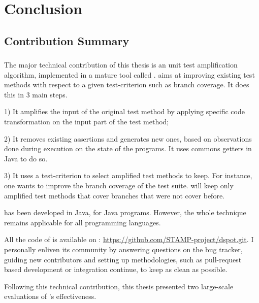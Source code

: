 \chapter{Conclusion}
\label{chap:conclusion}

\minitoc

\graphicspath{{.}{chapitres/conclusion/}}

\section{Contribution Summary}
\label{sec:conclusion:contributions-summary}

\subsection{\dspot}
\label{subsec:conclusion:contributions-summary:dspot}

The major technical contribution of this thesis is an unit test amplification algorithm, implemented in a mature tool called \dspot.
\dspot aims at improving existing test methods with respect to a given test-criterion such as branch coverage.
It does this in 3 main steps.

1) It amplifies the input of the original test method by applying specific code transformation on the input part of the test method;

2) It removes existing assertions and generates new ones, based on observations done during execution on the state of the programs.
It uses commons getters in Java to do so.

3) It uses a test-criterion to select amplified test methods to keep.
For instance, one wants to improve the branch coverage of the test suite.
\dspot will keep only amplified test methods that cover branches that were not cover before.

\dspot has been developed in Java, for Java programs.
However, the whole technique remains applicable for all programming languages.

All the code of \dspot is available on \gh: \url{https://github.com/STAMP-project/dspot.git}.
I personally enliven its community by answering questions on the bug tracker, guiding new contributors and setting up methodologies, such as pull-request based development or integration continue, to keep \dspot as clean as possible.

Following this technical contribution, this thesis presented two large-scale evaluations of \dspot's effectiveness.

